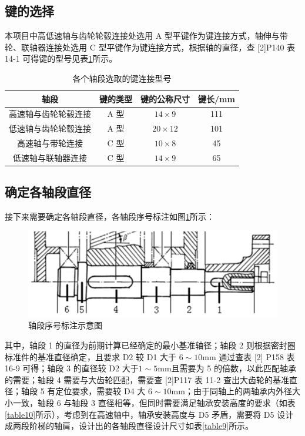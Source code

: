 \documentclass[12pt]{ctexart}
\begin{document}
\subsection{键的选择}

本项目中高低速轴与齿轮轮毂连接处选用 A 型平键作为键连接方式，轴伸与带轮、联轴器连接处选用 C 型平键作为键连接方式，根据轴的直径，查 [2]P140 表 14-1 可得键的型号见表\ref{table16}所示。

\begin{table}[htbp]
    \centering
    \begin{tabular}{c c c c}
        \toprule
        轴段 & 键的类型 & 键的公称尺寸  & 键长/mm \\
        \midrule
        高速轴与齿轮轮毂连接   & A 型 & $14\times 9$    & 111\\
        低速轴与齿轮轮毂连接   & A 型 & $20\times 12$   & 101\\
        高速轴与带轮连接      & C 型  & $10\times 8$     & 45\\
        低速轴与联轴器连接    & C 型  &  $14 \times 9$    & 65\\
        \bottomrule
    \end{tabular}
    \caption{各个轴段选取的键连接型号}
    \label{table16}
\end{table}



\subsection{确定各轴段直径}

接下来需要确定各轴段直径，各轴段序号标注如图\ref{figure8}所示：

\begin{figure}[htbp]
    \centering
    \includegraphics[scale=0.2]{roller.png}
    \caption{轴段序号标注示意图}\label{figure8}
\end{figure}

其中，轴段 1 的直径为前期计算已经确定的最小基准轴径；轴段 2 则根据密封圈标准件的基准直径确定，且要求 D2 较 D1 大于 $6\sim 10 \text{mm}$ 通过查表 [2] P158 表 16-9 可得；轴段 3 的直径较 D2 大于$1\sim 5\text{mm}$且需要为 5 的倍数，以此匹配轴承的需要；轴段 4 需要与大齿轮匹配，需要查 [2]P117 表 11-2 查出大齿轮的基准直径；轴段 5 有定位要求，需要较 D4 大 $6 \sim 10 \text{mm}$；由于同轴上的两轴承内外径大小一致，轴段 6 与轴段 3 直径相等，但同时需要满足轴承安装高度的要求（如表\ref{table10}所示），考虑到在高速轴中，轴承安装高度与 D5 矛盾，需要将 D5 设计成两段阶梯的轴肩，设计出的各轴段直径设计尺寸如表\ref{table9}所示。
\end{document}
